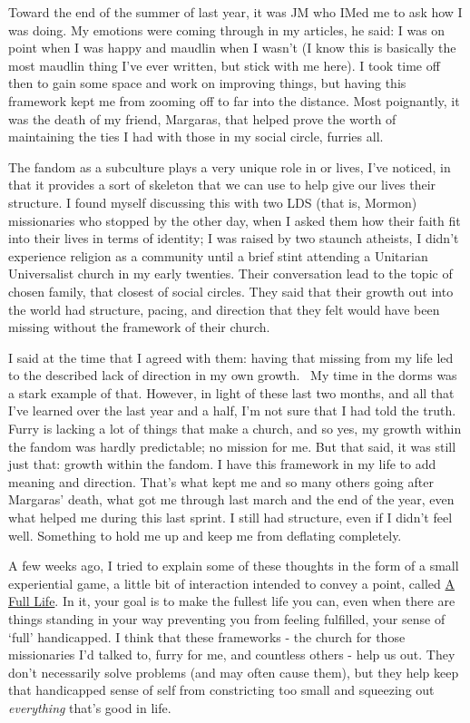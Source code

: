 Toward the end of the summer of last year, it was JM who IMed me to ask
how I was doing. My emotions were coming through in my articles, he
said: I was on point when I was happy and maudlin when I wasn't (I know
this is basically the most maudlin thing I've ever written, but stick
with me here). I took time off then to gain some space and work on
improving things, but having this framework kept me from zooming off to
far into the distance. Most poignantly, it was the death of my friend,
Margaras, that helped prove the worth of maintaining the ties I had with
those in my social circle, furries all.

The fandom as a subculture plays a very unique role in or lives, I've
noticed, in that it provides a sort of skeleton that we can use to help
give our lives their structure. I found myself discussing this with two
LDS (that is, Mormon) missionaries who stopped by the other day, when I
asked them how their faith fit into their lives in terms of identity; I
was raised by two staunch atheists, I didn't experience religion as a
community until a brief stint attending a Unitarian Universalist church
in my early twenties. Their conversation lead to the topic of chosen
family, that closest of social circles. They said that their growth out
into the world had structure, pacing, and direction that they felt would
have been missing without the framework of their church.

I said at the time that I agreed with them: having that missing from my
life led to the described lack of direction in my own growth. ~My time
in the dorms was a stark example of that. However, in light of these
last two months, and all that I've learned over the last year and a
half, I'm not sure that I had told the truth. Furry is lacking a lot of
things that make a church, and so yes, my growth within the fandom was
hardly predictable; no mission for me. But that said, it was still just
that: growth within the fandom. I have this framework in my life to add
meaning and direction. That's what kept me and so many others going
after Margaras' death, what got me through last march and the end of the
year, even what helped me during this last sprint. I still had
structure, even if I didn't feel well. Something to hold me up and keep
me from deflating completely.

A few weeks ago, I tried to explain some of these thoughts in the form
of a small experiential game, a little bit of interaction intended to
convey a point, called \href{http://a-full-life.drab-makyo.com/}{A Full
Life}. In it, your goal is to make the fullest life you can, even when
there are things standing in your way preventing you from feeling
fulfilled, your sense of `full' handicapped. I think that these
frameworks - the church for those missionaries I'd talked to, furry for
me, and countless others - help us out. They don't necessarily solve
problems (and may often cause them), but they help keep that handicapped
sense of self from constricting too small and squeezing out
\emph{everything} that's good in life.

